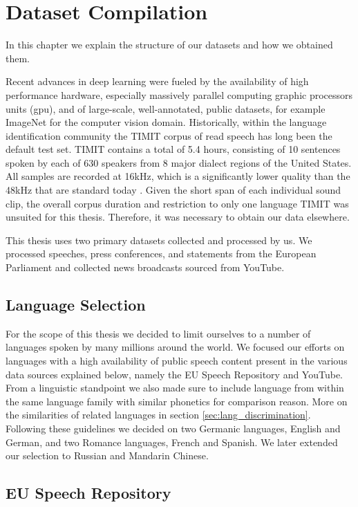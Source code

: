 \section{Dataset Compilation}
\label{sec:datasets}
	In this chapter we explain the structure of our datasets and how we obtained them.

	Recent advances in deep learning were fueled by the availability of high performance hardware, especially massively parallel computing graphic processors units (\ac{gpu}), and of large-scale, well-annotated, public datasets, for example ImageNet \cite{ILSVRC15} for the computer vision domain. Historically, within the language identification community the TIMIT corpus of read speech \cite{garofolo1993darpa} has long been the default test set. TIMIT contains a total of 5.4 hours, consisting of 10 sentences spoken by each of 630 speakers from 8 major dialect regions of the United States. All samples are recorded at 16kHz, which is a significantly lower quality than the 48kHz that are standard today . Given the short span of each individual sound clip, the overall corpus duration and restriction to only one language TIMIT was unsuited for this thesis. Therefore, it was necessary to obtain our data elsewhere. 
  
  	This thesis uses two primary datasets collected and processed by us. We processed speeches, press conferences, and statements from the European Parliament and collected news broadcasts sourced from YouTube.

\subsection{Language Selection}  
For the scope of this thesis we decided to limit ourselves to a number of  languages spoken by many millions around the world. We focused our efforts on languages with a high availability of public speech content present in the various data sources explained below, namely the EU Speech Repository and YouTube. From a linguistic standpoint we also made sure to include language from within the same language family with  similar phonetics for comparison reason. More on the similarities of related languages in section \ref{sec:lang_discrimination}. Following these guidelines we decided on two Germanic languages, English and German, and two Romance languages, French and Spanish. We later extended our selection to Russian and Mandarin Chinese.

\subsection{EU Speech Repository}

